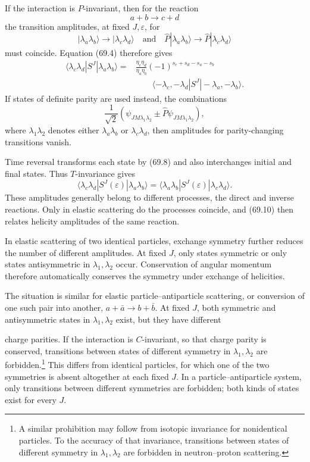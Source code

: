 If the interaction is $P$-invariant, then for the reaction
\[
a+b\to c+d
\]
the transition amplitudes, at fixed $J,\varepsilon$, for
\[
|\lambda_a\lambda_b\rangle\to|\lambda_c\lambda_d\rangle
\quad\text{and}\quad
\widehat P|\lambda_a\lambda_b\rangle\to\widehat P|\lambda_c\lambda_d\rangle
\]
must coincide. Equation (69.4) therefore gives
\begin{equation}
\begin{aligned}
\langle\lambda_c\lambda_d|S^J|\lambda_a\lambda_b\rangle
={}&\frac{\eta_c\eta_d}{\eta_a\eta_b}(-1)^{s_c+s_d-s_a-s_b}\\
&{}\qquad\langle-\lambda_c,-\lambda_d|S^J|-\lambda_a,-\lambda_b\rangle.
\end{aligned}
\tag{69.9}
\end{equation}
If states of definite parity are used instead, the combinations
\[
\frac1{\sqrt2}\left(\psi_{JM\lambda_1\lambda_2}\pm\widehat P\psi_{JM\lambda_1\lambda_2}\right),
\]
where $\lambda_1\lambda_2$ denotes either $\lambda_a\lambda_b$ or $\lambda_c\lambda_d$, then amplitudes for parity-changing transitions vanish.

Time reversal transforms each state by (69.8) and also interchanges initial and final states. Thus $T$-invariance gives
\begin{equation}
\langle\lambda_c\lambda_d|S^J(\varepsilon)|\lambda_a\lambda_b\rangle
=\langle\lambda_a\lambda_b|S^J(\varepsilon)|\lambda_c\lambda_d\rangle.
\tag{69.10}
\end{equation}
These amplitudes generally belong to different processes, the direct and inverse reactions. Only in elastic scattering do the processes coincide, and (69.10) then relates helicity amplitudes of the same reaction.

In elastic scattering of two identical particles, exchange symmetry further reduces the number of different amplitudes. At fixed $J$, only states symmetric or only states antisymmetric in $\lambda_1,\lambda_2$ occur. Conservation of angular momentum therefore automatically conserves the symmetry under exchange of helicities.

The situation is similar for elastic particle--antiparticle scattering, or conversion of one such pair into another, $a+\bar a\to b+\bar b$. At fixed $J$, both symmetric and antisymmetric states in $\lambda_1,\lambda_2$ exist, but they have different

charge parities. If the interaction is $C$-invariant, so that charge parity is conserved, transitions between states of different symmetry in $\lambda_1,\lambda_2$ are forbidden.\footnote{A similar prohibition may follow from isotopic invariance for nonidentical particles. To the accuracy of that invariance, transitions between states of different symmetry in $\lambda_1,\lambda_2$ are forbidden in neutron--proton scattering.} This differs from identical particles, for which one of the two symmetries is absent altogether at each fixed $J$. In a particle--antiparticle system, only transitions between different symmetries are forbidden; both kinds of states exist for every $J$.

